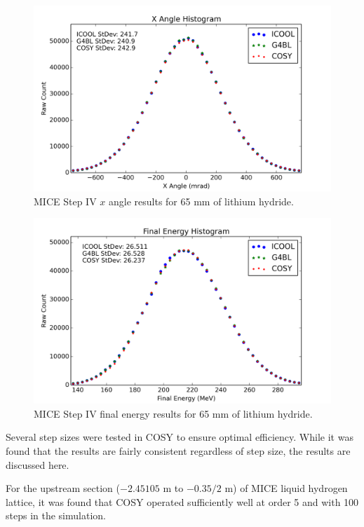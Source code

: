 \begin{figure}[H]
  \centering
    \includegraphics[width=\textwidth]{MICE data/LiH/px} 
  \caption{MICE Step IV $x$ angle results for 65 mm of lithium hydride.}
  \label{fig:mice_lih_xangle}
\end{figure}

\begin{figure}[H]
  \centering
    \includegraphics[width=\textwidth]{MICE data/LiH/e} 
  \caption{MICE Step IV final energy results for 65 mm of lithium hydride.}
  \label{fig:mice_lih_energy}
\end{figure}

\label{ssc:step_size_effects}
Several step sizes were tested in COSY to ensure optimal efficiency. While it was found that the results are fairly consistent regardless of step size, the results are discussed here.

For the upstream section ($-2.45105$ m to $-0.35/2$ m) of MICE liquid hydrogen lattice, it was found that COSY operated sufficiently well at order 5 and with 100 steps in the simulation.

